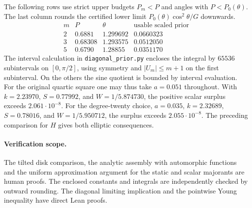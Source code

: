 The following rows use strict upper budgets $P_m<P$ and angles with
$P<P_0(\theta)$. The last column rounds the certified lower limit
$P_0(\theta)\cos^2\theta/G$ downwards.
\[
\begin{array}{c|c|c|c}
 m&P&\theta&\text{usable scaled prior}\\\hline
 2&0.6881 &1.299692&0.0660323\\
 3&0.68308&1.293575&0.0512050\\
 5&0.6790 &1.28855 &0.0351170
\end{array}
\]
The interval calculation in \texttt{diagonal\_prior.py} encloses the
integral by $65536$ subintervals on $[0,\pi/2]$, using symmetry and
$|U_m|\le m+1$ on the first subinterval. On the others the sine
quotient is bounded by interval evaluation. For the original quartic
square one may thus take $a=0.051$ throughout. With $k=2.23970$,
$S=0.77992$, and $W=1/5.874730$, the positive scalar surplus exceeds
$2.061\cdot10^{-8}$. For the degree-twenty choice, $a=0.035$,
$k=2.32689$, $S=0.78016$, and $W=1/5.950712$, the surplus exceeds
$2.055\cdot10^{-8}$. The preceding comparison for $H$ gives both
elliptic consequences.

\paragraph{Verification scope.}
The tilted disk comparison, the analytic assembly with automorphic
functions and the uniform approximation argument for the static and
scalar majorants are human proofs. The enclosed constants and integrals
are independently checked by outward rounding. The diagonal limiting
implication and the pointwise Young inequality have direct Lean proofs.
